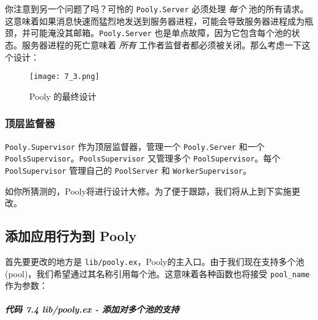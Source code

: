 你注意到另一个问题了吗？可怜的 \texttt{Pooly.Server}
必须处理 \emph{每个}
池的所有请求。这意味着如果消息快速而猛烈地发送到服务器进程，可能会导致服务器进程成为瓶颈，并可能淹没其邮箱。\texttt{Pooly.Server}
也是单点故障，因为它包含每个池的状态。服务器进程的死亡意味着 \emph{所有}
工作者监督者都必须被关闭。那么考虑一下这个设计：

\begin{figure}[!ht]
    \centering
    \texttt{[image: 7\_3.png]}
    \caption{Pooly 的最终设计}
    \label{fig:7_3}
\end{figure}



\subsubsection{顶层监督器}

\texttt{Pooly.Supervisor} 作为顶层监督器，管理一个
\texttt{Pooly.Server} 和一个
\texttt{PoolsSupervisor}。\texttt{PoolsSupervisor}
又管理多个 \texttt{PoolSupervisor}。每个
\texttt{PoolSupervisor} 管理自己的
\texttt{PoolServer} 和
\texttt{WorkerSupervisor}。

如你所猜测的，Pooly将进行设计大修。为了便于跟踪，我们将从上到下实施更改。


\subsection{添加应用行为到 Pooly}

首先要更改的地方是
\texttt{lib/pooly.ex}，Pooly的主入口。由于我们现在支持多个池(pool)，我们希望通过其名称引用每个池。这意味着各种函数也将接受
\texttt{pool\_name} 作为参数：


\subparagraph{代码 7.4 lib/pooly.ex -
添加对多个池的支持}

